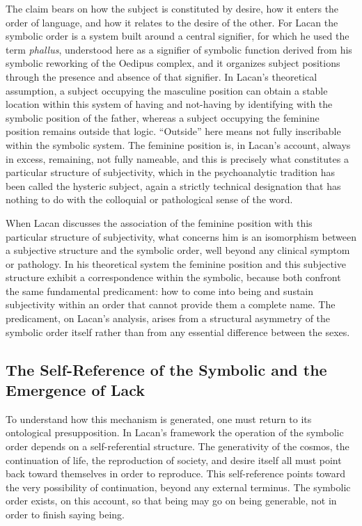 The claim bears on how the subject is constituted by desire, how it enters the order of language, and how it relates to the desire of the other. For Lacan the symbolic order is a system built around a central signifier, for which he used the term \textit{phallus}, understood here as a signifier of symbolic function derived from his symbolic reworking of the Oedipus complex, and it organizes subject positions through the presence and absence of that signifier. In Lacan's theoretical assumption, a subject occupying the masculine position can obtain a stable location within this system of having and not-having by identifying with the symbolic position of the father, whereas a subject occupying the feminine position remains outside that logic. ``Outside'' here means not fully inscribable within the symbolic system. The feminine position is, in Lacan's account, always in excess, remaining, not fully nameable, and this is precisely what constitutes a particular structure of subjectivity, which in the psychoanalytic tradition has been called the hysteric subject, again a strictly technical designation that has nothing to do with the colloquial or pathological sense of the word.

When Lacan discusses the association of the feminine position with this particular structure of subjectivity, what concerns him is an isomorphism between a subjective structure and the symbolic order, well beyond any clinical symptom or pathology. In his theoretical system the feminine position and this subjective structure exhibit a correspondence within the symbolic, because both confront the same fundamental predicament: how to come into being and sustain subjectivity within an order that cannot provide them a complete name. The predicament, on Lacan's analysis, arises from a structural asymmetry of the symbolic order itself rather than from any essential difference between the sexes.

\subsection{The Self-Reference of the Symbolic and the Emergence of Lack}

To understand how this mechanism is generated, one must return to its ontological presupposition. In Lacan's framework the operation of the symbolic order depends on a self-referential structure. The generativity of the cosmos, the continuation of life, the reproduction of society, and desire itself all must point back toward themselves in order to reproduce. This self-reference points toward the very possibility of continuation, beyond any external terminus. The symbolic order exists, on this account, so that being may go on being generable, not in order to finish saying being.


